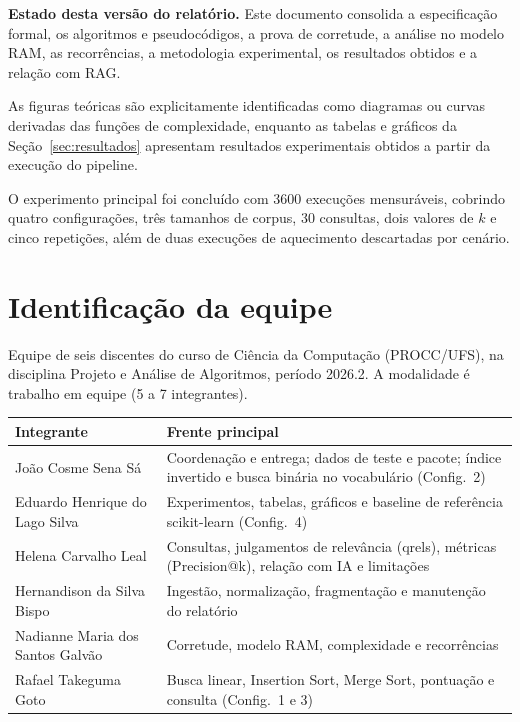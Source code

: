 \documentclass[11pt,a4paper]{article}
\begin{document}
\begin{status}
\textbf{Estado desta versão do relatório.}
Este documento consolida a especificação formal, os algoritmos e pseudocódigos,
a prova de corretude, a análise no modelo RAM, as recorrências, a metodologia experimental, os resultados obtidos e a relação com RAG.

As figuras teóricas são explicitamente identificadas como diagramas ou curvas derivadas
das funções de complexidade, enquanto as tabelas e gráficos da Seção~\ref{sec:resultados} apresentam resultados experimentais obtidos a partir da execução do pipeline.

O experimento principal foi concluído com 3600 execuções mensuráveis, cobrindo quatro configurações, três tamanhos de corpus, 30 consultas, dois valores de $k$ e cinco repetições, além de duas execuções de aquecimento descartadas por cenário.
\end{status}

\tableofcontents

\section{Identificação da equipe}
Equipe de seis discentes do curso de Ciência da Computação (PROCC/UFS), na disciplina Projeto e
Análise de Algoritmos, período 2026.2. A modalidade é trabalho em equipe (5 a 7 integrantes).

\begin{table}[h]
\small\centering
\begin{tabularx}{\textwidth}{@{}p{6cm}Y@{}}
\toprule
\textbf{Integrante} & \textbf{Frente principal}\\
\midrule
João Cosme Sena Sá & Coordenação e entrega; dados de teste e pacote; índice invertido e busca binária no vocabulário (Config.~2)\\
Eduardo Henrique do Lago Silva & Experimentos, tabelas, gráficos e baseline de referência scikit-learn (Config.~4)\\
Helena Carvalho Leal & Consultas, julgamentos de relevância (qrels), métricas (Precision@k), relação com IA e limitações\\
Hernandison da Silva Bispo & Ingestão, normalização, fragmentação e manutenção do relatório\\
Nadianne Maria dos Santos Galvão & Corretude, modelo RAM, complexidade e recorrências\\
Rafael Takeguma Goto & Busca linear, Insertion Sort, Merge Sort, pontuação e consulta (Config.~1 e 3)\\
\bottomrule
\end{tabularx}
\end{table}
\end{document}
